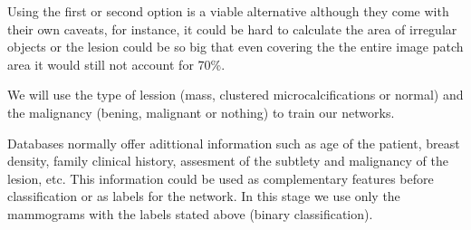 Using the first or second option is a viable alternative although they come with their own caveats, for instance, it could be hard to calculate the area of irregular objects or the lesion could be so big that even covering the the entire image patch area it would still not account for 70\%.

We will use the type of lession (mass, clustered microcalcifications or normal) and the malignancy (bening, malignant or nothing) to train our networks.

Databases normally offer adittional information such as age of the patient, breast density, family clinical history, assesment of the subtlety and malignancy of the lesion, etc. This information could be used as complementary features before classification or as labels for the network. In this stage we use only the mammograms with the labels stated above (binary classification).


